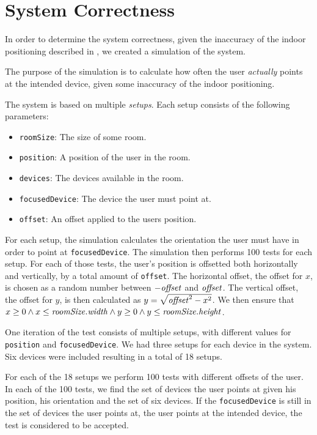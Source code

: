 \section{System Correctness}
\label{sec:evaluation:system-correctness}

In order to determine the system correctness, 
given the inaccuracy of the indoor positioning described in , 
we created a simulation of the system.

The purpose of the simulation is to calculate how often the user \emph{actually} points at the intended device, 
given some inaccuracy of the indoor positioning.

The system is based on multiple \textit{setups}. 
Each setup consists of the following parameters:
\begin{itemize}
\item \texttt{roomSize}: The size of some room.
\item \texttt{position}: A position of the user in the room.
\item \texttt{devices}: The devices available in the room.
\item \texttt{focusedDevice}: The device the user must point at.
\item \texttt{offset}: An offset applied to the users position.
\end{itemize}

For each setup, the simulation calculates the orientation the user must have in order to point at \texttt{focusedDevice}. 
The simulation then performs \num{100} tests for each setup. 
For each of those tests, 
the user's position is offsetted both horizontally and vertically, 
by a total amount of \texttt{offset}. 
The horizontal offset, \ie the offset for $x$, 
is chosen as a random number between $-\var{offset}$ and $\var{offset}$. 
The vertical offset, \ie the offset for $y$, 
is then calculated as $y = \sqrt{\var{offset}^2 - x^2}$. 
We then ensure that $x \geq 0 \wedge x \leq \var{roomSize.width} \wedge y \geq 0 \wedge y \leq \var{roomSize.height}$.

One iteration of the test consists of multiple setups, 
with different values for \texttt{position} and \texttt{focusedDevice}. 
We had three setups for each device in the system. 
Six devices were included resulting in a total of 18 setups.

For each of the \num{18} setups we perform \num{100} tests with different offsets of the user. 
In each of the \num{100} tests, 
we find the set of devices the user points at given his position, 
his orientation and the set of six devices. 
If the \texttt{focusedDevice} is still in the set of devices the user points at, 
\ie the user points at the intended device,
the test is considered to be accepted. 

